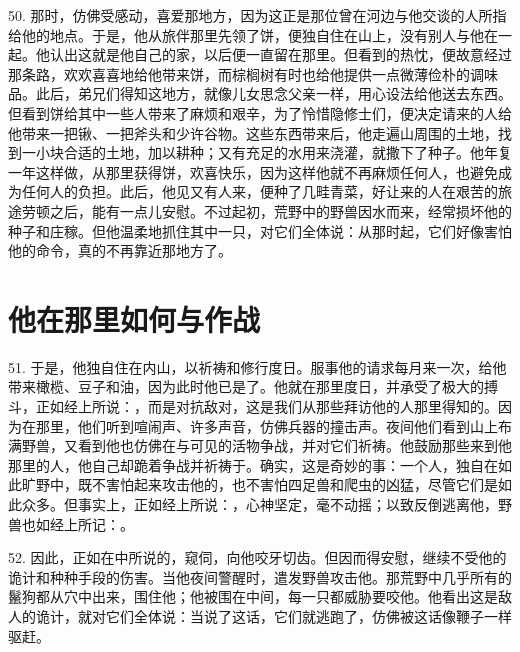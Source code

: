 50. 那时，仿佛受感动，喜爱那地方，因为这正是那位曾在河边与他交谈的人所指给他的地点。于是，他从旅伴那里先领了饼，便独自住在山上，没有别人与他在一起。他认出这就是他自己的家，以后便一直留在那里。但看到的热忱，便故意经过那条路，欢欢喜喜地给他带来饼，而棕榈树有时也给他提供一点微薄俭朴的调味品。此后，弟兄们得知这地方，就像儿女思念父亲一样，用心设法给他送去东西。但看到饼给其中一些人带来了麻烦和艰辛，为了怜惜隐修士们，便决定请来的人给他带来一把锹、一把斧头和少许谷物。这些东西带来后，他走遍山周围的土地，找到一小块合适的土地，加以耕种；又有充足的水用来浇灌，就撒下了种子。他年复一年这样做，从那里获得饼，欢喜快乐，因为这样他就不再麻烦任何人，也避免成为任何人的负担。此后，他见又有人来，便种了几畦青菜，好让来的人在艰苦的旅途劳顿之后，能有一点儿安慰。不过起初，荒野中的野兽因水而来，经常损坏他的种子和庄稼。但他温柔地抓住其中一只，对它们全体说：从那时起，它们好像害怕他的命令，真的不再靠近那地方了。\par


\section{他在那里如何与作战}

51. 于是，他独自住在内山，以祈祷和修行度日。服事他的请求每月来一次，给他带来橄榄、豆子和油，因为此时他已是了。他就在那里度日，并承受了极大的搏斗，正如经上所说：，而是对抗敌对，这是我们从那些拜访他的人那里得知的。因为在那里，他们听到喧闹声、许多声音，仿佛兵器的撞击声。夜间他们看到山上布满野兽，又看到他也仿佛在与可见的活物争战，并对它们祈祷。他鼓励那些来到他那里的人，他自己却跪着争战并祈祷于。确实，这是奇妙的事：一个人，独自在如此旷野中，既不害怕起来攻击他的，也不害怕四足兽和爬虫的凶猛，尽管它们是如此众多。但事实上，正如经上所说：，心神坚定，毫不动摇；以致反倒逃离他，野兽也如经上所记：。\par

52. 因此，正如在中所说的，窥伺，向他咬牙切齿。但因而得安慰，继续不受他的诡计和种种手段的伤害。当他夜间警醒时，遣发野兽攻击他。那荒野中几乎所有的鬣狗都从穴中出来，围住他；他被围在中间，每一只都威胁要咬他。他看出这是敌人的诡计，就对它们全体说：当说了这话，它们就逃跑了，仿佛被这话像鞭子一样驱赶。\par

